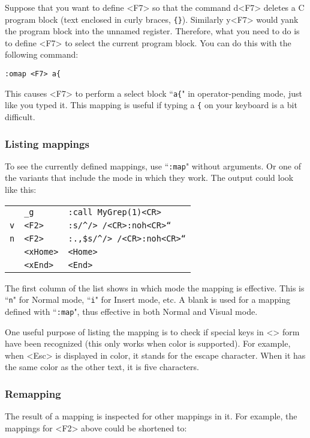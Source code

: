 Suppose that you want to define <F7> so that the command d<F7> deletes a C program block (text enclosed in curly braces, \texttt{\{\}}).
Similarly y<F7> would yank the program block into the unnamed register.
Therefore, what you need to do is to define <F7> to select the current program block.
You can do this with the following command:

\begin{Verbatim}[samepage=true]
 :omap <F7> a{
\end{Verbatim}

This causes <F7> to perform a select block ``\texttt{a\{}" in operator-pending mode, just like you typed it.
This mapping is useful if typing a \texttt{\{} on your keyboard is a bit difficult.
\subsubsection{Listing mappings}
To see the currently defined mappings, use ``\texttt{:map}" without arguments.
Or one of the variants that include the mode in which they work.
The output could look like this:

\begin{center} \begin{tabular}{l l l}
				& \texttt{\_g} & \texttt{:call MyGrep(1)<CR>} \\
				\texttt{v} &  \texttt{<F2>} & \texttt{:s/\string^/> /<CR>:noh<CR>``} \\
				\texttt{n} &  \texttt{<F2>} & \texttt{:.,\$s/\string^/> /<CR>:noh<CR>``} \\
				& \texttt{<xHome>} & \texttt{<Home>} \\
				& \texttt{<xEnd>} & \texttt{<End>} \\
\end{tabular} \end{center}

The first column of the list shows in which mode the mapping is effective.
This is ``\texttt{n}" for Normal mode, ``\texttt{i}" for Insert mode, etc.
A blank is used for a mapping defined with ``\texttt{:map}", thus effective in both Normal and Visual mode.

One useful purpose of listing the mapping is to check if special keys in <> form have been recognized (this only works when color is supported).
For example, when <Esc> is displayed in color, it stands for the escape character.
When it has the same color as the other text, it is five characters.

\subsubsection{Remapping}
The result of a mapping is inspected for other mappings in it.
For example, the mappings for <F2> above could be shortened to:

